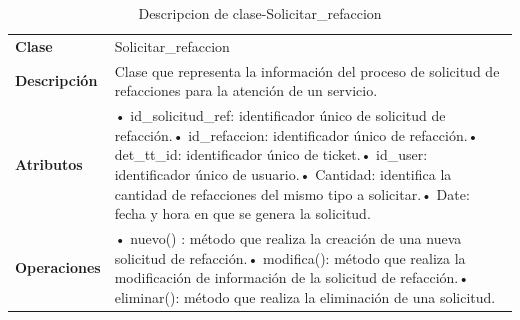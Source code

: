 \begin{table}[H]
	\centering
	\caption{Descripcion de clase-Solicitar\_refaccion}
	\begin{tabular}{|p{6.145em}|p{28.07em}|}
		\toprule
		\rowcolor[rgb]{ .125,  .216,  .392} \multicolumn{2}{|p{34.215em}|}{\textcolor[rgb]{ 1,  1,  1}{\textbf{Clase Solicitar\_refaccion}}} \\
		\midrule
		\textbf{Clase} & \multicolumn{1}{l|}{Solicitar\_refaccion} \\
		\midrule
		\textbf{Descripción} & Clase que representa la información del proceso de solicitud de refacciones para la atención de un servicio. \\
		\midrule
		\textbf{Atributos } & •	id\_solicitud\_ref: identificador único de solicitud de refacción.\newline{}•	id\_refaccion: identificador único de refacción.\newline{}•	det\_tt\_id: identificador único de ticket.\newline{}•	id\_user: identificador único de usuario.\newline{}•	Cantidad: identifica la cantidad de refacciones del mismo tipo a solicitar.\newline{}•	Date: fecha y hora en que se genera la solicitud. \\
		\midrule
		\textbf{Operaciones} & •	nuevo() :  método que realiza la creación de una nueva solicitud de refacción.\newline{}•	modifica(): método que  realiza la modificación de información de la solicitud de refacción.\newline{}•	eliminar(): método que realiza la eliminación de una solicitud. \\
		\bottomrule
	\end{tabular}%
	\label{tab:clas15}%
\end{table}%


